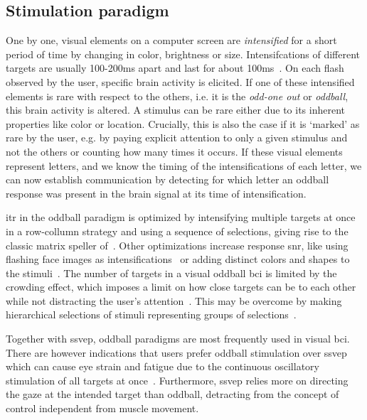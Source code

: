 \subsection{Stimulation paradigm}
One by one, visual elements on a computer screen are \emph{intensified} for a
short period of time by changing in color, brightness or size.
Intensifcations of different targets are usually 100-200ms apart and last for about
100ms~\cite{Sellers2006a}.
On each flash observed by the user, specific brain activity is elicited.
If one of these intensified elements is rare with respect to the others, i.e. it is the
\emph{odd-one out} or \emph{oddball}, this brain activity is altered.
A stimulus can be rare either due to its inherent properties like color or
location.
Crucially, this is also the case if it is `marked' as rare by the user, e.g.
by paying explicit attention to only a given stimulus and not the others or
counting how many times it occurs.
If these visual elements represent letters, and we know the timing of the
intensifications of each letter, we can now establish communication by detecting
for which letter an oddball response was present in the brain signal at its
time of intensification.

\Ac{itr} in the oddball paradigm is optimized by intensifying
multiple targets at once in a row-collumn strategy and using a sequence of
selections, giving rise to the classic matrix speller of~\cite{Farwell1988}.
Other optimizations increase response \ac{snr}, like using flashing face
images as intensifications~\cite{Jin2012} or adding distinct colors and shapes to the
stimuli~\cite{Treder2011}.
The number of targets in a visual oddball \ac{bci} is limited by the crowding
effect, which imposes a limit on how close targets can be to each other while
not distracting the user's attention~\cite{Sellers2006a,Li2010}.
This may be overcome by making hierarchical selections of stimuli representing
groups of selections~\cite{Treder2010}.

Together with \ac{ssvep}, oddball paradigms are most frequently used in visual
\ac{bci}.
There are however indications that users prefer oddball stimulation over
\ac{ssvep} which can cause eye strain and fatigue due to the continuous
oscillatory stimulation of all targets at once~\cite{Xu2021}.
Furthermore, \ac{ssvep} relies more on directing the gaze at the intended
target than oddball, detracting from the concept of control independent from
muscle movement.

